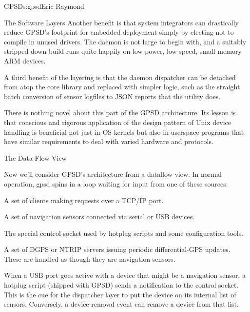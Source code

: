 \begin{aosachapter}{GPSD}{s:gpsd}{Eric Raymond}
\begin{aosasect1}{The Software Layers}
Another benefit is that system integrators can drastically reduce
GPSD's footprint for embedded deployment simply by electing not to
compile in unused drivers.  The daemon is not large to begin with, and
a suitably stripped-down build runs quite happily on low-power,
low-speed, small-memory ARM devices.

A third benefit of the layering is that the daemon dispatcher can be
detached from atop the core library and replaced with simpler logic,
such as the straight batch conversion of sensor logfiles to JSON
reports that the  utility does.

There is nothing novel about this part of the GPSD architecture. Its
lesson is that conscious and rigorous application of the design
pattern of Unix device handling is beneficial not just in OS kernels
but also in userspace programs that have similar requirements to deal
with varied hardware and protocols.

\end{aosasect1}

\begin{aosasect1}{The Data-Flow View}

Now we'll consider GPSD's architecture from a dataflow view.  In
normal operation, gpsd spins in a loop waiting for input from one of
these sources:

\begin{aosaenumerate}

  \item A set of clients making requests over a TCP/IP port.

  \item A set of navigation sensors connected via serial or USB
    devices.

  \item The special control socket used by hotplug scripts and some
    configuration tools.

  \item A set of DGPS or NTRIP servers issuing periodic
    differential-GPS updates.  These are handled as though they are
    navigation sensors.

\end{aosaenumerate}

When a USB port goes active with a device that might be a navigation
sensor, a hotplug script (shipped with GPSD) sends a notification to
the control socket.  This is the cue for the dispatcher layer to put
the device on its internal list of sensors.  Conversely, a
device-removal event can remove a device from that list.


\end{aosasect1}
\end{aosachapter}
